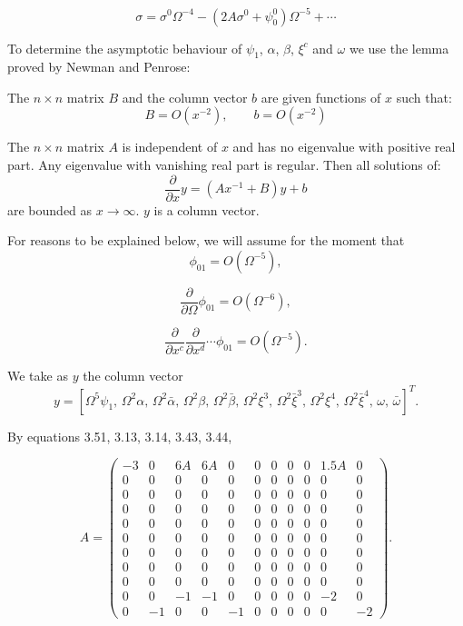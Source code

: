 \begin{equation}
\sigma
=
\sigma^{0}\Omega^{-4}
-
\left(
2A\sigma^{0}
+
\psi_{0}^{0}
\right)\Omega^{-5}
+\cdots
\tag{6.16}
\end{equation}



To determine the asymptotic behaviour of
$\psi_1$, $\alpha$, $\beta$, $\xi^c$ and $\omega$
we use the lemma proved by Newman and Penrose:

The $n\times n$ matrix $B$ and the column vector $b$ are
given functions of $x$ such that:
\begin{equation}
B = O(x^{-2}),
\qquad
b = O(x^{-2})
\tag{6.17}
\end{equation}

The $n\times n$ matrix $A$ is independent of $x$ and has no
eigenvalue with positive real part. Any eigenvalue with
vanishing real part is regular. Then all solutions of:
\begin{equation}
\frac{\partial}{\partial x}y
=
\left(Ax^{-1}+B\right)y+b
\tag{6.18}
\end{equation}
are bounded as $x\rightarrow\infty$. $y$ is a column
vector.

For reasons to be explained below, we will assume for
the moment that
\[
\phi_{01}=O(\Omega^{-5}),
\]

\[
\frac{\partial}{\partial\Omega}\phi_{01}
=
O(\Omega^{-6}),
\tag{6.19}
\]

\[
\frac{\partial}{\partial x^c}
\frac{\partial}{\partial x^d}
\cdots
\phi_{01}
=
O(\Omega^{-5}).
\]

We take as $y$ the column vector
\begin{equation}
y=
\left[
\Omega^5\psi_1,\,
\Omega^2\alpha,\,
\Omega^2\bar{\alpha},\,
\Omega^2\beta,\,
\Omega^2\bar{\beta},\,
\Omega^2\xi^3,\,
\Omega^2\bar{\xi}^3,\,
\Omega^2\xi^4,\,
\Omega^2\bar{\xi}^4,\,
\omega,\,
\bar{\omega}
\right]^T .
\tag{6.20}
\end{equation}

By equations 3.51, 3.13, 3.14, 3.43, 3.44,

\begin{equation}
A=
\begin{pmatrix}
-3 & 0 & 6A & 6A & 0 & 0 & 0 & 0 & 0 & 1.5A & 0 \\
 0 & 0 & 0  & 0  & 0 & 0 & 0 & 0 & 0 & 0    & 0 \\
 0 & 0 & 0  & 0  & 0 & 0 & 0 & 0 & 0 & 0    & 0 \\
 0 & 0 & 0  & 0  & 0 & 0 & 0 & 0 & 0 & 0    & 0 \\
 0 & 0 & 0  & 0  & 0 & 0 & 0 & 0 & 0 & 0    & 0 \\
 0 & 0 & 0  & 0  & 0 & 0 & 0 & 0 & 0 & 0    & 0 \\
 0 & 0 & 0  & 0  & 0 & 0 & 0 & 0 & 0 & 0    & 0 \\
 0 & 0 & 0  & 0  & 0 & 0 & 0 & 0 & 0 & 0    & 0 \\
 0 & 0 & 0  & 0  & 0 & 0 & 0 & 0 & 0 & 0    & 0 \\
 0 & 0 & -1 & -1 & 0 & 0 & 0 & 0 & 0 & -2   & 0 \\
 0 & -1 & 0 & 0 & -1 & 0 & 0 & 0 & 0 & 0    & -2
\end{pmatrix}.
\tag{6.21}
\end{equation}

